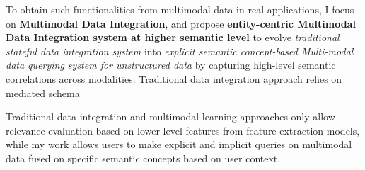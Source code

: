 To obtain such functionalities from multimodal data in real applications, I focus on \textbf{Multimodal Data Integration}, and propose \textbf{entity-centric Multimodal Data 
Integration %
system at higher semantic level} to evolve \textit{traditional stateful 
data integration system} into \textit{explicit semantic concept-based 
Multi-modal data querying system for unstructured data} by capturing high-level semantic correlations across modalities.
Traditional data integration approach relies on mediated schema

Traditional data integration 
and multimodal learning approaches only allow relevance evaluation based on lower level features from feature extraction models, while my work allows users to make explicit and implicit queries on multimodal data fused on specific semantic concepts based on user context.

